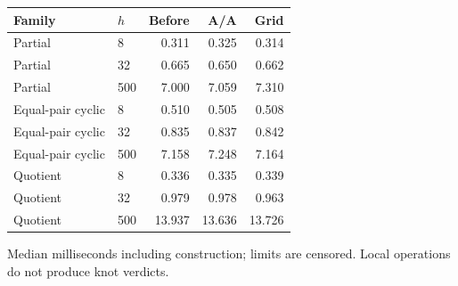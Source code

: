 \begin{center}\small
\begin{tabular}{@{}llrrr@{}}
\toprule
Family & $h$ & Before & A/A & Grid \\
\midrule
Partial & 8 & 0.311 & 0.325 & 0.314 \\
Partial & 32 & 0.665 & 0.650 & 0.662 \\
Partial & 500 & 7.000 & 7.059 & 7.310 \\
Equal-pair cyclic & 8 & 0.510 & 0.505 & 0.508 \\
Equal-pair cyclic & 32 & 0.835 & 0.837 & 0.842 \\
Equal-pair cyclic & 500 & 7.158 & 7.248 & 7.164 \\
Quotient & 8 & 0.336 & 0.335 & 0.339 \\
Quotient & 32 & 0.979 & 0.978 & 0.963 \\
Quotient & 500 & 13.937 & 13.636 & 13.726 \\
\bottomrule
\end{tabular}
\end{center}
Median milliseconds including construction; limits are censored. Local operations do not produce knot verdicts.
